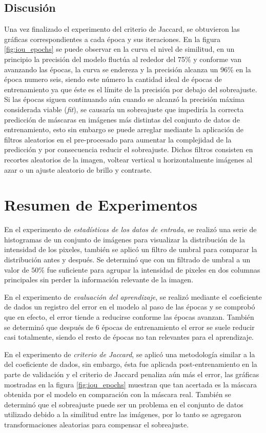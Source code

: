 \subsection{Discusión}
Una vez finalizado el experimento del criterio de Jaccard, se obtuvieron las gráficas correspondientes a cada época y sus iteraciones. En la figura \ref{fig:iou_epochs} se puede observar en la curva el nivel de similitud, en un principio la precisión del modelo fluctúa al rededor del 75\% y conforme van avanzando las épocas, la curva se endereza y la precisión alcanza un 96\% en la época numero seis, siendo este número la cantidad ideal de épocas de entrenamiento ya que éste es el límite de la precisión por debajo del sobreajuste. Si las épocas siguen continuando aún cuando se alcanzó la precisión máxima considerada viable (\emph{fit}), se causaría un sobreajuste que impediría la correcta predicción de máscaras en imágenes más distintas del conjunto de datos de entrenamiento, esto sin embargo se puede arreglar mediante la aplicación de filtros aleatorios en el pre-procesado para aumentar la complejidad de la predicción y por consecuencia reducir el sobreajuste. Dichos filtros consisten en recortes aleatorios de la imagen, voltear vertical u horizontalmente imágenes al azar o un ajuste aleatorio de brillo y contraste.


\section{Resumen de Experimentos}

En el experimento de \emph{estadísticas de los datos de entrada}, se realizó una serie de histogramas de un conjunto de imágenes para visualizar la distribución de la intensidad de los pixeles, también se aplicó un filtro de umbral para comparar la distribución antes y después. Se determinó que con un filtrado de umbral a un valor de $50\%$ fue suficiente para agrupar la intensidad de pixeles en dos columnas principales sin perder la información relevante de la imagen.

En el experimento de \emph{evaluación del aprendizaje}, se realizó mediante el coeficiente de dados un registro del error en el modelo al paso de las épocas y se comprobó que en efecto, el error tiende a reducirse conforme las épocas avanzan. También se determinó que después de 6 épocas de entrenamiento el error se suele reducir casi totalmente, siendo el resto de épocas no tan relevantes para el aprendizaje.

En el experimento de \emph{criterio de Jaccard}, se aplicó una metodología similar a la del coeficiente de dados, sin embargo, ésta fue aplicada post-entrenamiento en la parte de validación y el criterio de Jaccard penaliza aún más el error, las gráficas mostradas en la figura \ref{fig:iou_epochs} muestran que tan acertada es la máscara obtenida por el modelo en comparación con la máscara real. También se determinó que el sobreajuste puede ser un problema en el conjunto de datos utilizado debido a la similitud entre las imágenes, por lo tanto se agregaron transformaciones aleatorias para compensar el sobreajuste.



